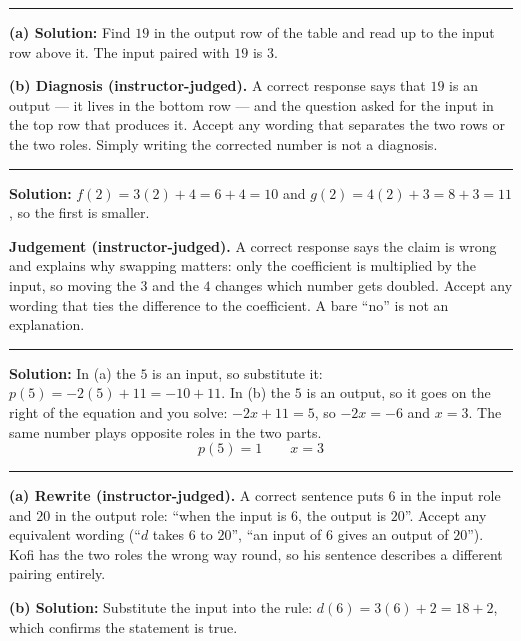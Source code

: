 \documentclass[12pt]{article}
\begin{document}
\noindent\rule{\linewidth}{0.2pt}


\textbf{(a) Solution:} \quad Find $19$ in the output row of the table and read up to the input
row above it. The input paired with $19$ is $3$. 

\textbf{(b) Diagnosis (instructor-judged).} A correct response says that $19$ is an output --- it
lives in the bottom row --- and the question asked for the input in the top row that produces it.
Accept any wording that separates the two rows or the two roles. Simply writing the corrected
number is not a diagnosis.

\vspace{0.25cm}

\noindent\rule{\linewidth}{0.2pt}


\textbf{Solution:} \quad $f(2) = 3(2) + 4 = 6 + 4 = 10$ and $g(2) = 4(2) + 3 = 8 + 3 = 11$, so
the first is smaller. 

\textbf{Judgement (instructor-judged).} A correct response says the claim is wrong and explains
why swapping matters: only the coefficient is multiplied by the input, so moving the $3$ and the
$4$ changes which number gets doubled. Accept any wording that ties the difference to the
coefficient. A bare ``no'' is not an explanation.

\vspace{0.25cm}

\noindent\rule{\linewidth}{0.2pt}


\textbf{Solution:} \quad In (a) the $5$ is an input, so substitute it:
$p(5) = -2(5) + 11 = -10 + 11$. In (b) the $5$ is an output, so it goes on the right of the
equation and you solve: $-2x + 11 = 5$, so $-2x = -6$ and $x = 3$. The same number plays
opposite roles in the two parts.
\[ \boxed{p(5) = 1 \qquad x = 3} \]

\vspace{0.25cm}

\noindent\rule{\linewidth}{0.2pt}


\textbf{(a) Rewrite (instructor-judged).} A correct sentence puts $6$ in the input role and $20$
in the output role: ``when the input is $6$, the output is $20$''. Accept any equivalent wording
(``$d$ takes $6$ to $20$'', ``an input of $6$ gives an output of $20$''). Kofi has the two roles
the wrong way round, so his sentence describes a different pairing entirely.

\textbf{(b) Solution:} \quad Substitute the input into the rule: $d(6) = 3(6) + 2 = 18 + 2$,
which confirms the statement is true. 
\end{document}

